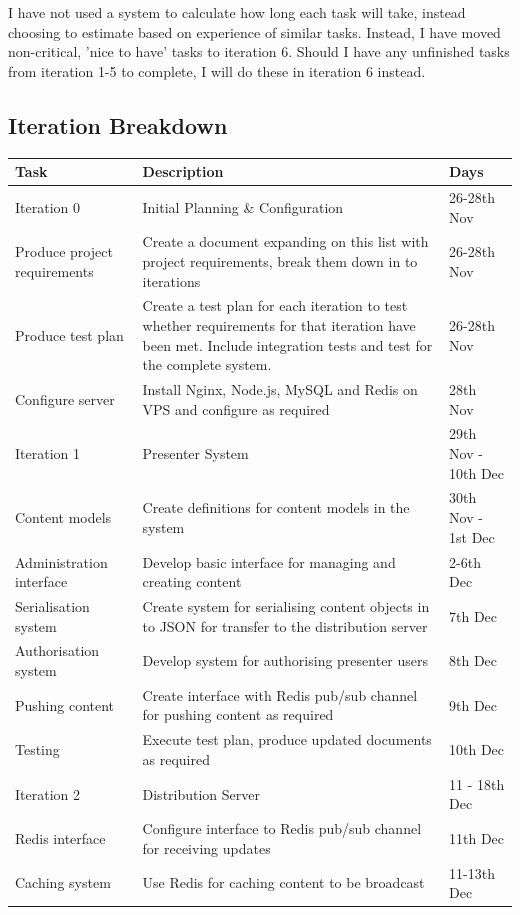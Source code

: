 \documentclass[a4papert,11pt,notitlepage]{ltxdoc}
\begin{document}
I have not used a system to calculate how long each task will take, instead choosing to estimate based on experience of similar tasks. Instead, I have moved non-critical, 'nice to have' tasks to iteration 6. Should I have any unfinished tasks from iteration 1-5 to complete, I will do these in iteration 6 instead.
 
\subsection{Iteration Breakdown}
\begin{longtable}{l p{7cm} l}
Task & Description & Days \\
\hline
Iteration 0 & Initial Planning \& Configuration & 26-28th Nov \\
\hline
Produce project requirements & Create a document expanding on this list with project requirements, break them down in to iterations & 26-28th Nov  \\
Produce test plan & Create a test plan for each iteration to test whether requirements for that iteration have been met. Include integration tests and test for the complete system. & 26-28th Nov \\
Configure server & Install Nginx, Node.js, MySQL and Redis on VPS and configure as required & 28th Nov \\[1cm]
\hline
Iteration 1 & Presenter System & 29th Nov - 10th Dec \\
\hline
Content models & Create definitions for content models in the system & 30th Nov - 1st Dec \\
Administration interface & Develop basic interface for managing and creating content & 2-6th Dec \\
Serialisation system & Create system for serialising content objects in to JSON for transfer to the distribution server & 7th Dec \\
Authorisation system & Develop system for authorising presenter users & 8th Dec \\
Pushing content & Create interface with Redis pub/sub channel for pushing content as required & 9th Dec \\
Testing & Execute test plan, produce updated documents as required & 10th Dec \\[1cm]
\hline
Iteration 2 & Distribution Server & 11 - 18th Dec \\
\hline
Redis interface & Configure interface to Redis pub/sub channel for receiving updates & 11th Dec \\
Caching system & Use Redis for caching content to be broadcast & 11-13th Dec \\

\end{longtable}
\end{document}
